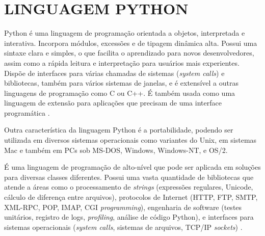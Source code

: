 %

\section{LINGUAGEM PYTHON}\label{sec:python}
Python é uma linguagem de programação orientada a objetos, interpretada e interativa. Incorpora módulos, excessões e de tipagem dinâmica alta. Possui uma sintaxe clara e simples, o que facilita o aprendizado para novos desenvolvedores, assim como a rápida leitura e interpretação para usuários mais experientes. Dispõe de interfaces para várias chamadas de sistemas (\textit{system calls}) e bibliotecas, também para vários sistemas de janelas, e é extensível a outras linguagens de programação como C ou C++. É também usada como uma linguagem de extensão para aplicações que precisam de uma interface programática \cite{python-doc}.

Outra característica da linguagem Python é a portabilidade, podendo ser utilizada em diversos sistemas operacionais como variantes do Unix, em sistemas Mac e também em PCs sob MS-DOS, Windows, Windows-NT, e OS/2.

É uma linguagem de programação de alto-nível que pode ser aplicada em soluções para diversas classes diferentes. Possui uma vasta quantidade de bibliotecas que atende a áreas como o processamento de \textit{strings} (expressões regulares, Unicode, cálculo de diferença entre arquivos), protocolos de Internet (HTTP, FTP, SMTP, XML-RPC, POP, IMAP, CGI \textit{programming}), engenharia de software (testes unitários, registro de logs, \textit{profiling}, análise de código Python), e interfaces para sistemas operacionais (\textit{system calls}, sistemas de arquivos, TCP/IP \textit{sockets}) \cite{python-doc}.

